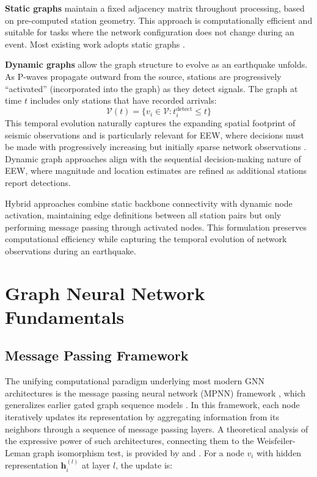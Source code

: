 \documentclass[review,authoryear]{elsarticle}
\begin{document}
\textbf{Static graphs} maintain a fixed adjacency matrix throughout processing, based on pre-computed station geometry. This approach is computationally efficient and suitable for tasks where the network configuration does not change during an event. Most existing work adopts static graphs \citep{vandenende2020automated, mcbrearty2023earthquake}.

\textbf{Dynamic graphs} allow the graph structure to evolve as an earthquake unfolds. As P-waves propagate outward from the source, stations are progressively ``activated'' (incorporated into the graph) as they detect signals. The graph at time $t$ includes only stations that have recorded arrivals:
\begin{equation}
\mathcal{V}(t) = \{v_i \in \mathcal{V} : t_i^{\text{detect}} \leq t\}
\end{equation}
This temporal evolution naturally captures the expanding spatial footprint of seismic observations and is particularly relevant for EEW, where decisions must be made with progressively increasing but initially sparse network observations \citep{munchmeyer2022team}. Dynamic graph approaches align with the sequential decision-making nature of EEW, where magnitude and location estimates are refined as additional stations report detections.

Hybrid approaches combine static backbone connectivity with dynamic node activation, maintaining edge definitions between all station pairs but only performing message passing through activated nodes. This formulation preserves computational efficiency while capturing the temporal evolution of network observations during an earthquake.


\section{Graph Neural Network Fundamentals}
\label{sec:gnn_fundamentals}

\subsection{Message Passing Framework}

The unifying computational paradigm underlying most modern GNN architectures is the message passing neural network (MPNN) framework \citep{gilmer2017neural}, which generalizes earlier gated graph sequence models \citep{li2016gated}. In this framework, each node iteratively updates its representation by aggregating information from its neighbors through a sequence of message passing layers. A theoretical analysis of the expressive power of such architectures, connecting them to the Weisfeiler-Leman graph isomorphism test, is provided by \citet{morris2019weisfeiler} and \citet{xu2019powerful}. For a node $v_i$ with hidden representation $\mathbf{h}_i^{(l)}$ at layer $l$, the update is:
\end{document}
